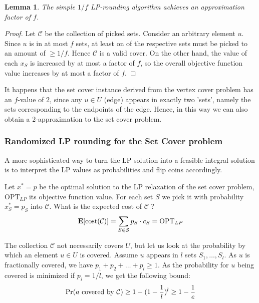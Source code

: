 \documentclass{article}
\newtheorem{lemma}{Lemma}
\begin{document}
\begin{lemma}
The simple $1/f$ LP-rounding algorithm achieves an approximation factor of $f$.
\end{lemma}
\begin{proof}
Let $\mathcal{C}$ be the collection of picked sets. Consider an arbitrary element $u$. Since $u$ is in at most $f$ sets,
at least on of the respective sets must be picked to an amount of $\geq 1/f$. Hence $\mathcal{C}$ is a valid cover.
On the other hand, the value of each $x_S$ is increased by at most a factor of $f$, so the overall objective function value
increases by at most a factor of $f$.
\end{proof}

It happens that the set cover instance derived from the vertex cover problem has an $f$-value of $2$, since any $u\in U$ (edge) appears in exactly two 'sets', namely the sets corresponding to the endpoints of the edge. Hence, in this way we can also obtain a $2$-approximation to the set cover problem.


\subsubsection{Randomized LP rounding for the Set Cover problem}
A more sophisticated way to turn the LP solution into a feasible integral solution is to interpret the LP values
as probabilities and flip coins accordingly.

Let $x^*=p$ be the optimal solution to the LP relaxation of the set cover problem, $\mathrm{OPT}_{LP}$ its objective function value.
For each set $S$ we pick it with probability $x^*_S=p_S$ into $\mathcal{C}$. What is the expected cost of $\mathcal{C}$ ?
\[
	{\bf E}[\mathrm{cost}(\mathcal{C})]=\sum_{S\in \mathcal{S}} p_S\cdot c_S=\mathrm{OPT}_{LP}
\]

The collection $\mathcal{C}$ not necessarily covers $U$, but let us look at the probability by which an element $u\in U$ is covered.
Assume $u$ appears in $l$ sets $S_1, \dots, S_l$. As $u$ is fractionally covered, we have $p_1+p_2+\dots +p_l\geq 1$.
As the probability for $u$ being covered is minimized if $p_i=1/l$, we get the following bound:
\[
	{\bf \mathrm{Pr}}(a \mathrm{~ covered~by~ }\mathcal{C}) \geq 1 - (1-\frac{1}{l})^l \geq 1- \frac{1}{e}
\]
\end{document}
